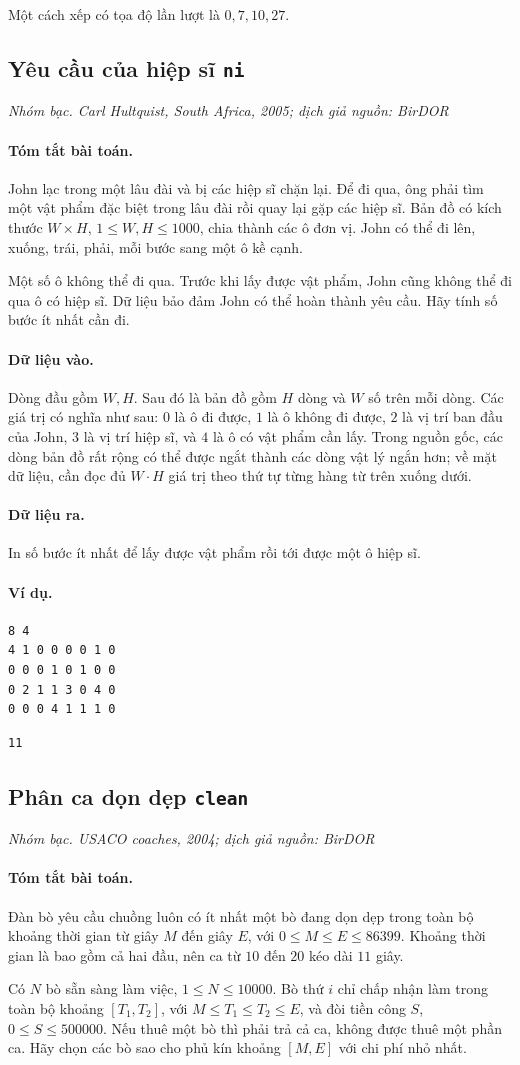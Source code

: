 \documentclass[11pt]{article}
\newcommand{\problem}[4]{%
  \subsection[#1 (#2)]{#1 \hfill {\normalsize\texttt{#2}}}%
  \noindent\textit{#3. #4}\par\smallskip
}
\newcommand{\iosec}[1]{\paragraph{#1}}
\begin{document}
Một cách xếp có tọa độ lần lượt là \(0,7,10,27\).

\problem{Yêu cầu của hiệp sĩ}{ni}{Nhóm bạc}{Carl Hultquist, South Africa, 2005; dịch giả nguồn: BirDOR}

\iosec{Tóm tắt bài toán.}
John lạc trong một lâu đài và bị các hiệp sĩ chặn lại. Để đi qua, ông phải
tìm một vật phẩm đặc biệt trong lâu đài rồi quay lại gặp các hiệp sĩ. Bản đồ
có kích thước \(W\times H\), \(1\le W,H\le 1000\), chia thành các ô đơn vị.
John có thể đi lên, xuống, trái, phải, mỗi bước sang một ô kề cạnh.

Một số ô không thể đi qua. Trước khi lấy được vật phẩm, John cũng không thể đi
qua ô có hiệp sĩ. Dữ liệu bảo đảm John có thể hoàn thành yêu cầu. Hãy tính số
bước ít nhất cần đi.

\iosec{Dữ liệu vào.}
Dòng đầu gồm \(W,H\). Sau đó là bản đồ gồm \(H\) dòng và \(W\) số trên mỗi
dòng. Các giá trị có nghĩa như sau: \(0\) là ô đi được, \(1\) là ô không đi
được, \(2\) là vị trí ban đầu của John, \(3\) là vị trí hiệp sĩ, và \(4\) là
ô có vật phẩm cần lấy. Trong nguồn gốc, các dòng bản đồ rất rộng có thể được
ngắt thành các dòng vật lý ngắn hơn; về mặt dữ liệu, cần đọc đủ \(W\cdot H\)
giá trị theo thứ tự từng hàng từ trên xuống dưới.

\iosec{Dữ liệu ra.}
In số bước ít nhất để lấy được vật phẩm rồi tới được một ô hiệp sĩ.

\iosec{Ví dụ.}
\begin{verbatim}
8 4
4 1 0 0 0 0 1 0
0 0 0 1 0 1 0 0
0 2 1 1 3 0 4 0
0 0 0 4 1 1 1 0
\end{verbatim}

\begin{verbatim}
11
\end{verbatim}

\problem{Phân ca dọn dẹp}{clean}{Nhóm bạc}{USACO coaches, 2004; dịch giả nguồn: BirDOR}

\iosec{Tóm tắt bài toán.}
Đàn bò yêu cầu chuồng luôn có ít nhất một bò đang dọn dẹp trong toàn bộ
khoảng thời gian từ giây \(M\) đến giây \(E\), với \(0\le M\le E\le 86399\).
Khoảng thời gian là bao gồm cả hai đầu, nên ca từ \(10\) đến \(20\) kéo dài
\(11\) giây.

Có \(N\) bò sẵn sàng làm việc, \(1\le N\le 10000\). Bò thứ \(i\) chỉ chấp
nhận làm trong toàn bộ khoảng \([T_1,T_2]\), với \(M\le T_1\le T_2\le E\), và
đòi tiền công \(S\), \(0\le S\le 500000\). Nếu thuê một bò thì phải trả cả
ca, không được thuê một phần ca. Hãy chọn các bò sao cho phủ kín khoảng
\([M,E]\) với chi phí nhỏ nhất.
\end{document}
